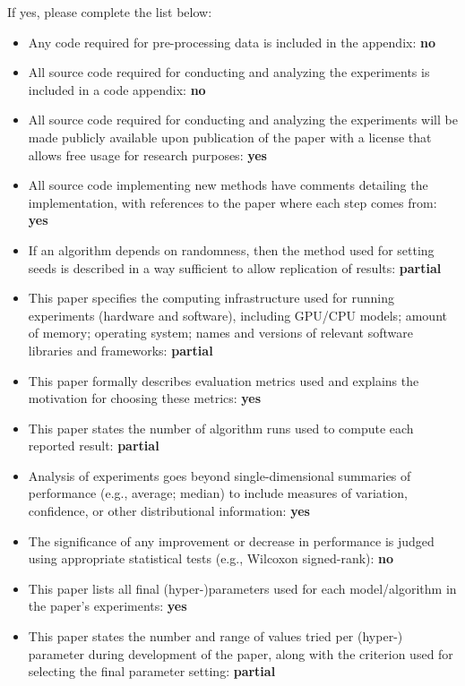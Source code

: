 If yes, please complete the list below:
\begin{itemize}
    \item[] Any code required for pre-processing data is included in the appendix: \textbf{no}
    \item[] All source code required for conducting and analyzing the experiments is included in a code appendix: \textbf{no}
    \item[] All source code required for conducting and analyzing the experiments will be made publicly available upon publication of the paper with a license that allows free usage for research purposes: \textbf{yes}
    \item[] All source code implementing new methods have comments detailing the implementation, with references to the paper where each step comes from: \textbf{yes}
    \item[] If an algorithm depends on randomness, then the method used for setting seeds is described in a way sufficient to allow replication of results: \textbf{partial}
    \item[] This paper specifies the computing infrastructure used for running experiments (hardware and software), including GPU/CPU models; amount of memory; operating system; names and versions of relevant software libraries and frameworks: \textbf{partial}
    \item[] This paper formally describes evaluation metrics used and explains the motivation for choosing these metrics: \textbf{yes}
    \item[] This paper states the number of algorithm runs used to compute each reported result: \textbf{partial}
    \item[] Analysis of experiments goes beyond single-dimensional summaries of performance (e.g., average; median) to include measures of variation, confidence, or other distributional information: \textbf{yes}
    \item[] The significance of any improvement or decrease in performance is judged using appropriate statistical tests (e.g., Wilcoxon signed-rank): \textbf{no}
    \item[] This paper lists all final (hyper-)parameters used for each model/algorithm in the paper's experiments: \textbf{yes}
    \item[] This paper states the number and range of values tried per (hyper-) parameter during development of the paper, along with the criterion used for selecting the final parameter setting: \textbf{partial}
\end{itemize}
